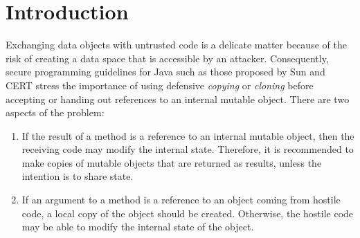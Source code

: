 \documentclass{LMCS}
\begin{document}
\iffalse
  La Guerre des Clones n'aura pas lieu.
  Spécification et validation de politiques de copie d'objet.
Dans les langages orientés objets, l'échange de données mutables avec du code
  inconnu est un sujet délicat, en raison du risque de création d'un espace de
  données accessible à un attaquant. Pour parer à cette éventualité, plusieurs
  normes de programmation recommandent d'effectuer des copies défensives avant
  d'accepter ou de renvoyer des références à un objet mutable interne.
En revanche, l'implémentation de méthodes de copie telles que clone() est
  laissé à la charge du développeur. Celle-ci risque alors de ne pas fournir de
  copie assez profonde, et est sujette à redéfinition par une sous-classe
  malveillante. Actuellement aucun mécanisme ne permet de sécuriser la copie
  d'objet. 
Notre travail propose un système d'annotation de types permettant la
  définition modulaire de politiques de copie pour des programmes orientés
  objet. Ces politiques définissent le niveau maximal de partage autorisé entre
  un objet et son clone. Nous présentons un mécanisme de vérification statique
  qui garantit que toutes les classes respectent leur politique de copie, y
  compris dans le cas où des méthodes de copie sont redéfinies, et dont nous
  établissons la correction sémantique en Coq. Ce mécanisme est implémenté et
  validé expérimentalement sur les méthodes de clone de plusieurs librairies
  Java.
\fi


\maketitle


\section{Introduction}


Exchanging data objects with untrusted code is a delicate matter because
of the risk of creating a data space that is accessible by an attacker.
Consequently, secure programming guidelines for Java such as those proposed by
Sun \cite{SunGuidelines:2010} and CERT \cite{CertGuidelines:2010} stress the
importance of using defensive \emph{copying} or \emph{cloning} before
accepting or handing out references to an internal mutable object. There are
two aspects of the problem:
\begin{enumerate}[(1)]
\item If the result of a method is a reference to an internal mutable object,
  then the receiving code may modify the internal state. Therefore, it is
  recommended to make copies of mutable objects that are returned as
  results, unless the intention is to share state. 
\item If an argument to a method is a reference to an object coming
  from hostile code, a local copy of the object should be
  created. Otherwise, the hostile code may be able to modify the internal
  state of the object.
\end{enumerate}
\end{document}
